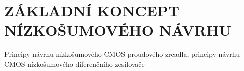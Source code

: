 \section{ZÁKLADNÍ KONCEPT NÍZKOŠUMOVÉHO NÁVRHU}
Principy návrhu nízkošumového CMOS proudového zrcadla, principy návrhu CMOS nízkošumového diferenčního zesilovače